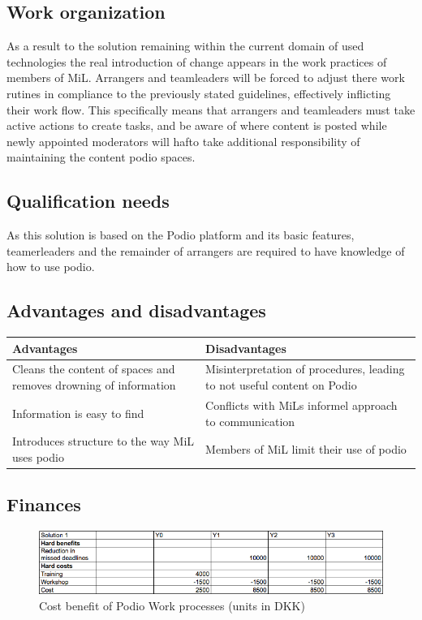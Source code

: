 \subsection{Work organization}
As a result to the solution remaining within the current domain of used technologies the real introduction of change appears in the work practices of members of MiL. Arrangers and teamleaders will be forced to adjust there work rutines in compliance to the previously stated guidelines, effectively inflicting their work flow. 
This specifically means that arrangers and teamleaders must take active actions to create tasks, and be aware of where content is posted while newly appointed moderators will hafto take additional responsibility of maintaining the content podio spaces.

\subsection{Qualification needs}
As this solution is based on the Podio platform and its basic features, teamerleaders and the remainder of arrangers are required to have knowledge of how to use podio.  

\subsection{Advantages and disadvantages}
\begin{center}
    \begin{tabular}{ | p{7cm} | p{7cm} |}
    \hline
    \textbf{Advantages} & \textbf{Disadvantages}  \\ \hline
    Cleans the content of spaces and removes drowning of information & Misinterpretation of procedures, leading to not useful content on Podio  \\ \hline
    Information is easy to find & Conflicts with MiLs informel approach to communication \\
    \hline
    Introduces structure to the way MiL uses podio & Members of MiL limit their use of podio \\ \hline
    \end{tabular}
\end{center}

\subsection{Finances}
\begin{figure}[h!]
  \centering
\includegraphics[scale=0.5]{Pictures/cost-benefit1.png}
    \caption{Cost benefit of Podio Work processes (units in DKK)}
\end{figure}



